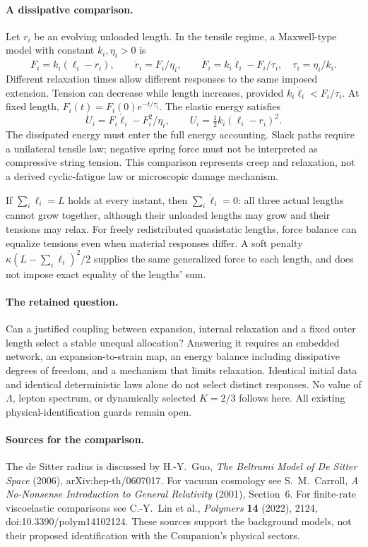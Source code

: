 \paragraph{A dissipative comparison.}
Let $r_i$ be an evolving unloaded length. In the tensile regime, a
Maxwell-type model with constant $k_i,\eta_i>0$ is
\begin{equation}
 F_i=k_i(\ell_i-r_i),\qquad
 \dot r_i=F_i/\eta_i,\qquad
 \dot F_i=k_i\dot\ell_i-F_i/\tau_i,\quad \tau_i=\eta_i/k_i.
\end{equation}
Different relaxation times allow different responses to the same imposed
extension. Tension can decrease while length increases, provided
$k_i\dot\ell_i<F_i/\tau_i$. At fixed length,
$F_i(t)=F_i(0)e^{-t/\tau_i}$. The elastic energy satisfies
\begin{equation}
 \dot U_i=F_i\dot\ell_i-F_i^2/\eta_i,\qquad
 U_i=\tfrac12 k_i(\ell_i-r_i)^2.
\end{equation}
The dissipated energy must enter the full energy accounting. Slack paths
require a unilateral tensile law; negative spring force must not be
interpreted as compressive string tension. This comparison represents
creep and relaxation, not a derived cyclic-fatigue law or microscopic
damage mechanism.

If $\sum_i\ell_i=L$ holds at every instant, then
$\sum_i\dot\ell_i=0$: all three actual lengths cannot grow together,
although their unloaded lengths may grow and their tensions may relax.
For freely redistributed quasistatic lengths, force balance can equalize
tensions even when material responses differ. A soft penalty
$\kappa(L-\sum_i\ell_i)^2/2$ supplies the same generalized force to
each length, and does not impose exact equality of the lengths' sum.

\paragraph{The retained question.}
Can a justified coupling between expansion, internal relaxation and a
fixed outer length select a stable unequal allocation? Answering it
requires an embedded network, an expansion-to-strain map, an energy
balance including dissipative degrees of freedom, and a mechanism that
limits relaxation. Identical initial data and identical deterministic
laws alone do not select distinct responses. No value of $\Lambda$,
lepton spectrum, or dynamically selected $K=2/3$ follows here. All
existing physical-identification guards remain open.

\paragraph{Sources for the comparison.}
The de Sitter radius is discussed by H.-Y.~Guo,
\emph{The Beltrami Model of De Sitter Space} (2006),
arXiv:hep-th/0607017. For vacuum cosmology see S.~M.~Carroll,
\emph{A No-Nonsense Introduction to General Relativity} (2001),
Section~6. For finite-rate viscoelastic comparisons see C.-Y.~Lin
et al., \emph{Polymers} \textbf{14} (2022), 2124,
doi:10.3390/polym14102124. These sources support the background models,
not their proposed identification with the Companion's physical sectors.
